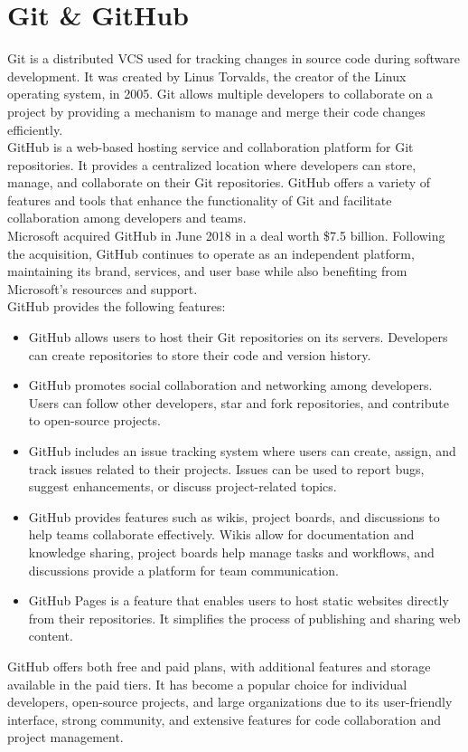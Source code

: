 \section{Git \& GitHub}
Git is a distributed \ac{VCS} used for tracking changes in source code during software development. It was created by Linus Torvalds, the creator of the Linux operating system, in 2005. Git allows multiple developers to collaborate on a project by providing a mechanism to manage and merge their code changes efficiently.\vspace{5mm} \\
GitHub is a web-based hosting service and collaboration platform for Git repositories. It provides a centralized location where developers can store, manage, and collaborate on their Git repositories. GitHub offers a variety of features and tools that enhance the functionality of Git and facilitate collaboration among developers and teams.\vspace{5mm} \\
Microsoft acquired GitHub in June 2018 in a deal worth \$7.5 billion. Following the acquisition, GitHub continues to operate as an independent platform, maintaining its brand, services, and user base while also benefiting from Microsoft's resources and support.\vspace{5mm} \\
GitHub provides the following features:
\begin{itemize}
  \item GitHub allows users to host their Git repositories on its servers. Developers can create repositories to store their code and version history.
  \item GitHub promotes social collaboration and networking among developers. Users can follow other developers, star and fork repositories, and contribute to open-source projects.
  \item GitHub includes an issue tracking system where users can create, assign, and track issues related to their projects. Issues can be used to report bugs, suggest enhancements, or discuss project-related topics.
  \item GitHub provides features such as wikis, project boards, and discussions to help teams collaborate effectively. Wikis allow for documentation and knowledge sharing, project boards help manage tasks and workflows, and discussions provide a platform for team communication.
  \item GitHub Pages is a feature that enables users to host static websites directly from their repositories. It simplifies the process of publishing and sharing web content.
\end{itemize}
GitHub offers both free and paid plans, with additional features and storage available in the paid tiers. It has become a popular choice for individual developers, open-source projects, and large organizations due to its user-friendly interface, strong community, and extensive features for code collaboration and project management.
